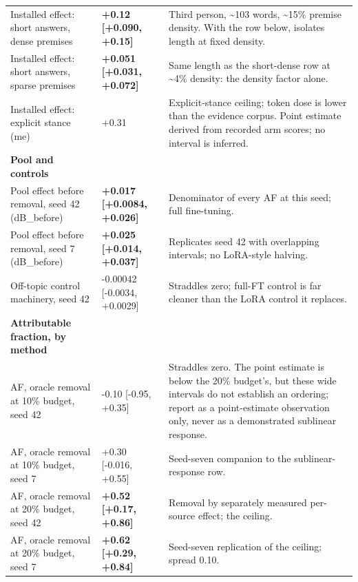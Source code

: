 \documentclass[10pt]{article}
\begin{document}
{\begin{longtable}{ p{4.08cm}lp{7.60cm} }
Installed effect: short answers, dense premises & \textbf{ +0.12 [+0.090, +0.15] } & Third person, \textasciitilde{}103 words, \textasciitilde{}15\% premise density. With the row below, isolates length at fixed density. \\

Installed effect: short answers, sparse premises & \textbf{ +0.051 [+0.031, +0.072] } & Same length as the short-dense row at \textasciitilde{}4\% density: the density factor alone. \\

Installed effect: explicit stance (me) & +0.31 & Explicit-stance ceiling; token dose is lower than the evidence corpus. Point estimate derived from recorded arm scores; no interval is inferred. \\

\textbf{ Pool and controls } &  &  \\

Pool effect before removal, seed 42 (dB\_before) & \textbf{ +0.017 [+0.0084, +0.026] } & Denominator of every AF at this seed; full fine-tuning. \\

Pool effect before removal, seed 7 (dB\_before) & \textbf{ +0.025 [+0.014, +0.037] } & Replicates seed 42 with overlapping intervals; no LoRA-style halving. \\

Off-topic control machinery, seed 42 & -0.00042 [-0.0034, +0.0029] & Straddles zero; full-FT control is far cleaner than the LoRA control it replaces. \\

\textbf{ Attributable fraction, by method } &  &  \\

AF, oracle removal at 10\% budget, seed 42 & -0.10 [-0.95, +0.35] & Straddles zero. The point estimate is below the 20\% budget's, but these wide intervals do not establish an ordering; report as a point-estimate observation only, never as a demonstrated sublinear response. \\

AF, oracle removal at 10\% budget, seed 7 & +0.30 [-0.016, +0.55] & Seed-seven companion to the sublinear-response row. \\

AF, oracle removal at 20\% budget, seed 42 & \textbf{ +0.52 [+0.17, +0.86] } & Removal by separately measured per-source effect; the ceiling. \\

AF, oracle removal at 20\% budget, seed 7 & \textbf{ +0.62 [+0.29, +0.84] } & Seed-seven replication of the ceiling; spread 0.10. \\


\end{longtable}}
\end{document}
